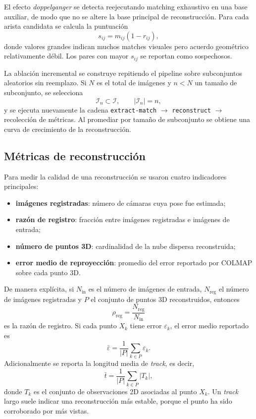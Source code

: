 \documentclass[conference]{IEEEtran}
\begin{document}
El efecto \emph{doppelganger} se detecta reejecutando matching exhaustivo en una base auxiliar, de modo que no se altere la base principal de reconstrucci\'on. Para cada arista candidata se calcula la puntuaci\'on
\begin{equation}
s_{ij} = m_{ij}(1-r_{ij}),
\end{equation}
donde valores grandes indican muchos matches visuales pero acuerdo geom\'etrico relativamente d\'ebil. Los pares con mayor \(s_{ij}\) se reportan como sospechosos.

La ablaci\'on incremental se construye repitiendo el pipeline sobre subconjuntos aleatorios sin reemplazo. Si \(N\) es el total de im\'agenes y \(n < N\) un tama\~no de subconjunto, se selecciona
\begin{equation}
\mathcal{I}_n \subset \mathcal{I}, \qquad |\mathcal{I}_n| = n,
\end{equation}
y se ejecuta nuevamente la cadena \texttt{extract-match} \(\rightarrow\) \texttt{reconstruct} \(\rightarrow\) recolecci\'on de m\'etricas. Al promediar por tama\~no de subconjunto se obtiene una curva de crecimiento de la reconstrucci\'on.

\subsection{M\'etricas de reconstrucci\'on}

Para medir la calidad de una reconstrucci\'on se usaron cuatro indicadores principales:
\begin{itemize}
  \item \textbf{im\'agenes registradas}: n\'umero de c\'amaras cuya pose fue estimada;
  \item \textbf{raz\'on de registro}: fracci\'on entre im\'agenes registradas e im\'agenes de entrada;
  \item \textbf{n\'umero de puntos 3D}: cardinalidad de la nube dispersa reconstruida;
  \item \textbf{error medio de reproyecci\'on}: promedio del error reportado por COLMAP sobre cada punto 3D.
\end{itemize}

De manera expl\'icita, si \(N_{\mathrm{in}}\) es el n\'umero de im\'agenes de entrada, \(N_{\mathrm{reg}}\) el n\'umero de im\'agenes registradas y \(P\) el conjunto de puntos 3D reconstruidos, entonces
\begin{equation}
\rho_{\mathrm{reg}} = \frac{N_{\mathrm{reg}}}{N_{\mathrm{in}}}
\end{equation}
es la raz\'on de registro. Si cada punto \(X_k\) tiene error \(\varepsilon_k\), el error medio reportado es
\begin{equation}
\bar{\varepsilon} = \frac{1}{|P|}\sum_{k \in P}\varepsilon_k.
\end{equation}
Adicionalmente se reporta la longitud media de \emph{track}, es decir,
\begin{equation}
\bar{t} = \frac{1}{|P|}\sum_{k \in P} |T_k|,
\end{equation}
donde \(T_k\) es el conjunto de observaciones 2D asociadas al punto \(X_k\). Un \emph{track} largo suele indicar una reconstrucci\'on m\'as estable, porque el punto ha sido corroborado por m\'as vistas.
\end{document}
